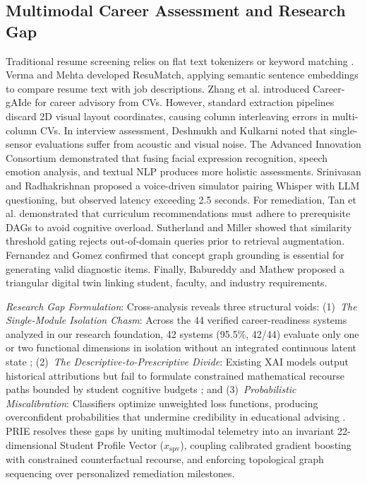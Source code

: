 \documentclass[conference]{IEEEtran}
\begin{document}
\subsection{Multimodal Career Assessment and Research Gap}
Traditional resume screening relies on flat text tokenizers or keyword matching \cite{b9,b10}. Verma and Mehta \cite{b15} developed ResuMatch, applying semantic sentence embeddings to compare resume text with job descriptions. Zhang et al. \cite{b11} introduced Career-gAIde for career advisory from CVs. However, standard extraction pipelines discard 2D visual layout coordinates, causing column interleaving errors in multi-column CVs. In interview assessment, Deshmukh and Kulkarni \cite{b12} noted that single-sensor evaluations suffer from acoustic and visual noise. The Advanced Innovation Consortium \cite{b13} demonstrated that fusing facial expression recognition, speech emotion analysis, and textual NLP produces more holistic assessments. Srinivasan and Radhakrishnan \cite{b19} proposed a voice-driven simulator pairing Whisper with LLM questioning, but observed latency exceeding 2.5 seconds. For remediation, Tan et al. \cite{b14} demonstrated that curriculum recommendations must adhere to prerequisite DAGs to avoid cognitive overload. Sutherland and Miller \cite{b18} showed that similarity threshold gating rejects out-of-domain queries prior to retrieval augmentation. Fernandez and Gomez \cite{b20} confirmed that concept graph grounding is essential for generating valid diagnostic items. Finally, Babureddy and Mathew \cite{b21} proposed a triangular digital twin linking student, faculty, and industry requirements.

\textit{Research Gap Formulation}: Cross-analysis reveals three structural voids: (1)~\textit{The Single-Module Isolation Chasm}: Across the 44 verified career-readiness systems analyzed in our research foundation, 42 systems (95.5\%, 42/44) evaluate only one or two functional dimensions in isolation without an integrated continuous latent state \cite{b3,b6}; (2)~\textit{The Descriptive-to-Prescriptive Divide}: Existing XAI models output historical attributions but fail to formulate constrained mathematical recourse paths bounded by student cognitive budgets \cite{b16,b17}; and (3)~\textit{Probabilistic Miscalibration}: Classifiers optimize unweighted loss functions, producing overconfident probabilities that undermine credibility in educational advising \cite{b8}. PRIE resolves these gaps by uniting multimodal telemetry into an invariant 22-dimensional Student Profile Vector ($x_{\text{spv}}$), coupling calibrated gradient boosting with constrained counterfactual recourse, and enforcing topological graph sequencing over personalized remediation milestones.
\end{document}
